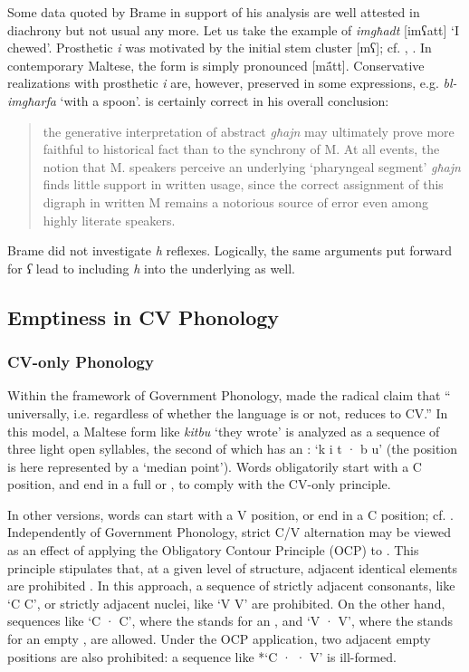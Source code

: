\documentclass[output=paper]{langsci/langscibook}
\begin{document}
Some data quoted by Brame in support of his analysis are well attested in diachrony but not usual any more. Let us take the example of \textit{imgħadt} [imʕatt] ‘I chewed’. Prosthetic \textit{i} was motivated by the initial stem cluster [mʕ]; cf. \citet[46]{Brame1972}, \citet[14]{Comrie1986}. In contemporary Maltese, the form is simply pronounced [m\'ātt]. Conservative realizations with prosthetic \textit{i} are, however, preserved in some expressions, e.g. \textit{bl-imgħarfa} ‘with a spoon’. \citet[262]{Borg1997} is certainly correct in his overall conclusion:

\begin{quote}
the generative interpretation of abstract \textit{għajn} may ultimately prove more faithful to historical fact than to the synchrony of M. At all events, the notion that M. speakers perceive an underlying ‘pharyngeal segment’ \textit{għajn} finds little support in written usage, since the correct assignment of this digraph in written M remains a notorious source of error even among highly literate speakers.
\end{quote}

Brame did not investigate \textit{h} reflexes. Logically, the same arguments put forward for \textit{ʕ} lead to including \textit{h} into the underlying  as well. 

\subsection{Emptiness in CV Phonology}
\subsubsection{CV-only Phonology}
Within the framework of Government Phonology, \citet{Lowenstamm1996} made the radical claim that “ universally, i.e. regardless of whether the language is  or not, reduces to CV.” In this model, a Maltese form like \textit{kitbu} ‘they wrote’ is analyzed as a sequence of three light open syllables, the second of which has an : ‘k i t · b u’ (the  position is here represented by a ‘median point’). Words obligatorily start with a C position, and end in a full or , to comply with the CV-only principle. 

In other versions, words can start with a V position, or end in a C position; cf. \citet[111]{Polgardy2012}. Independently of Government Phonology, strict C/V alternation may be viewed as an effect of applying the Obligatory Contour Principle (OCP) to . This principle stipulates that, at a given level of structure, adjacent identical elements are prohibited \citep{McCarthy1986,Odden1986}. In this approach, a sequence of strictly adjacent consonants, like ‘C C’, or strictly adjacent nuclei, like ‘V V’ are prohibited. On the other hand, sequences like ‘C · C’, where the  stands for an , and ‘V · V’, where the  stands for an empty , are allowed. Under the OCP application, two adjacent empty positions are also prohibited: a sequence like *‘C · · V’ is ill-formed.
\end{document}
